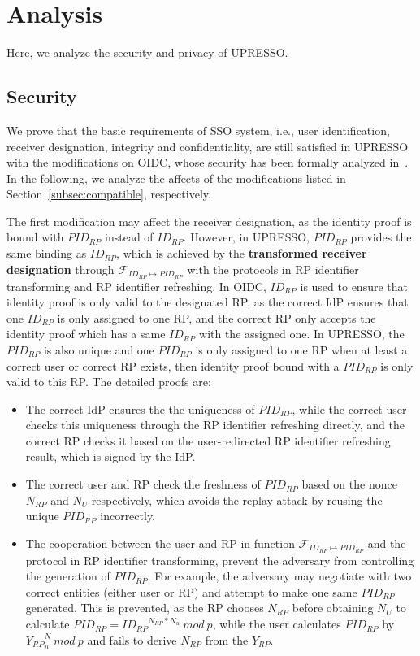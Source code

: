 \section{Analysis}
\label{sec:analysis}
Here, we analyze the security and privacy of UPRESSO.

\subsection{Security}
\label{subsec:security}
We prove that the basic requirements of SSO system, i.e., user identification, receiver designation, integrity and confidentiality,  are still satisfied in UPRESSO with the modifications on OIDC, whose security  has been formally analyzed in~\cite{FettKS17}.
In the following, we analyze the affects of the modifications listed in Section~\ref{subsec:compatible}, respectively.

The first modification may affect the receiver designation, as the identity proof is bound with $PID_{RP}$ instead of $ID_{RP}$.
However, in UPRESSO, $PID_{RP}$ provides the same binding as $ID_{RP}$, which is achieved by the \textbf{transformed receiver designation} through $\mathcal{F}_{ID_{RP} \mapsto PID_{RP}}$  with the protocols in  RP identifier transforming and RP identifier refreshing.
In OIDC, $ID_{RP}$ is used to ensure that  identity proof is only valid to the designated RP, as the correct IdP ensures that one $ID_{RP}$ is only assigned to one RP, and the correct RP only accepts the identity proof which has a same $ID_{RP}$ with the assigned one.
In UPRESSO, the $PID_{RP}$ is also unique
and one $PID_{RP}$ is  only assigned to one RP when at least a correct user or correct RP exists, then identity proof bound with a $PID_{RP}$ is only valid to this RP. The detailed proofs are:
\begin{itemize}
  \item The correct IdP ensures the the uniqueness of $PID_{RP}$, while the correct user checks this uniqueness through the RP identifier refreshing directly, and the correct RP checks it based on the user-redirected RP identifier refreshing result, which is signed by the IdP.
  \item The correct user and RP check the freshness of $PID_{RP}$ based on the nonce $N_{RP}$ and $N_U$ respectively,
   which avoids the replay attack by reusing the unique $PID_{RP}$ incorrectly.
  \item The cooperation between the user and RP in function $\mathcal{F}_{ID_{RP} \mapsto PID_{RP}}$ and the protocol in RP identifier transforming, prevent the adversary from controlling the generation of $PID_{RP}$. For example, the adversary may negotiate with two correct entities (either user or RP) and attempt to make one same $PID_{RP}$ generated.
  This is prevented, as the RP chooses $N_{RP}$ before obtaining $N_{U}$ to calculate $PID_{RP}={ID_{RP}}^{N_{RP}*N_{u}}\ mod \ p$, while the user calculates $PID_{RP}$ by ${Y_{RP}}^N_{u}\ mod \ p$ and  fails to derive $N_{RP}$ from the $Y_{RP}$.
\end{itemize}


